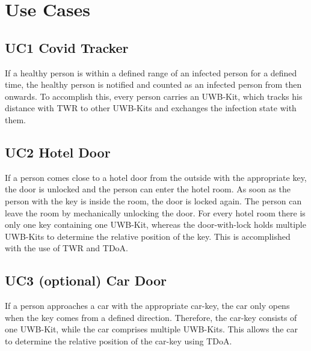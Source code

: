 \newpage
\section{Use Cases}
\label{sec:use_cases}
\subsection{UC1 Covid Tracker}
If a healthy person is within a defined range of an infected person for a defined time, the healthy person is notified and counted as an infected person from then onwards. To accomplish this, every person carries an UWB-Kit, which tracks his distance with TWR to other UWB-Kits and exchanges the infection state with them. 

\subsection{UC2 Hotel Door}
If a person comes close to a hotel door from the outside with the appropriate key, the door is unlocked and the person can enter the hotel room. As soon as the person with the key is inside the room, the door is locked again. The person can leave the room by mechanically unlocking the door. For every hotel room there is only one key containing one UWB-Kit, whereas the door-with-lock holds multiple UWB-Kits to determine the relative position of the key. This is accomplished with the use of TWR and TDoA. 

\subsection{UC3 (optional) Car Door}
If a person approaches a car with the appropriate car-key, the car only opens when the key comes from a defined direction. Therefore, the car-key consists of one UWB-Kit, while the car comprises multiple UWB-Kits. This allows the car to determine the relative position of the car-key using TDoA.
